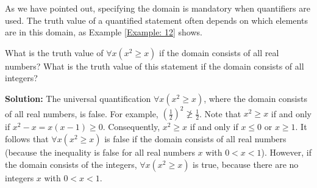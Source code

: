 \documentclass{Axon}
\begin{document}
As we have pointed out, specifying the domain is mandatory when quantifiers are used. The truth value of a quantified statement often depends on which elements are in this domain, as Example \ref{Example: 12} shows.

\begin{example}\label{Example: 12}
    What is the truth value of \(\forall x (x^2 \ge x)\) if the domain consists of all real numbers? What is the truth value of this statement if the domain consists of all integers?

    \noindent
    \textbf{Solution:}
    The universal quantification \(\forall x(x^2 \ge x)\), where the domain consists of all real numbers, is false. For example, \(\left(\frac{1}{2}\right)^2 \not\ge \frac{1}{2}\). Note that \(x^2 \ge x\) if and only if \(x^2 - x = x(x - 1) \ge 0\). Consequently, \(x^2 \ge x\) if and only if \(x \le 0\) or \(x \ge 1\). It follows that \(\forall x (x^2 \geq x)\) is false if the domain consists of all real numbers (because the inequality is false for all real numbers \(x\) with \(0 < x < 1\)). However, if the domain consists of the integers, \(\forall x(x^2 \ge x)\) is true, because there are no integers \(x\) with \(0 < x < 1\).
\end{example}

\printbibliography
\end{document}
